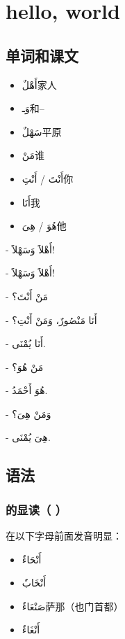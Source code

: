 \chapter{hello, world}


\section{单词和课文}

\begin{itemize}
    \item \ac{أَهْلٌ}{家人}
    \item \ac{وَـ}{和--}
    \item \ac{سَهْلٌ}{平原}
    \item \ac{مَنْ}{谁}
    \item \ac{أَنْتَ / أَنْتِ}{你}
    \item \ac{أَنَا}{我}
    \item \ac{هُوَ / هِىَ}{他}
\end{itemize}

\begin{Arabic}
    - أَهْلاََ وَسَهْلاََ!

    - أَهْلاََ وَسَهْلاََ!

    - مَنْ أَنْتَ؟

    - أَنَا مَنْصُورٌ، وَمَنْ أَنْتِ؟

    - أَنَا يُمْنَى.

    - مَنْ هُوَ؟

    - هُوَ أَحْمَدُ.

    - وَمَنْ هِىَ؟

    - هِىَ يُمْنَى.
\end{Arabic}

\section{语法}

\subsection{  的显读（ ）}

 在以下字母前面发音明显：

\begin{itemize}
    \item \ac{أَنْحَاءٌ}{}
    \item \ac{أَنْخَابٌ}{}
    \item \ac{صَنْعَاءٌ}{萨那（也门首都）}
    \item \ac{أَنْغَاءٌ}{}
\end{itemize}

